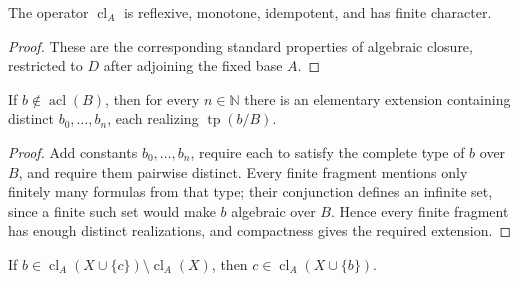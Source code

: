 \begin{lemma}
\label{lem:strongly-minimal-closure-laws}
\leanok
{}
The operator \(\operatorname{cl}_A\) is reflexive, monotone, idempotent,
and has finite character.
\end{lemma}

\begin{proof}
\leanok
These are the corresponding standard properties of algebraic closure,
restricted to \(D\) after adjoining the fixed base \(A\).
\end{proof}

\begin{lemma}
\label{lem:nonalgebraic-type-many-realizations}
\leanok
{}
If \(b\notin\operatorname{acl}(B)\), then for every
\(n\in\mathbb N\) there is an elementary extension containing distinct
\(b_0,\ldots,b_n\), each realizing \(\operatorname{tp}(b/B)\).
\end{lemma}

\begin{proof}
\leanok
Add constants \(b_0,\ldots,b_n\), require each to satisfy the complete
type of \(b\) over \(B\), and require them pairwise distinct.  Every
finite fragment mentions only finitely many formulas from that type;
their conjunction defines an infinite set, since a finite such set would
make \(b\) algebraic over \(B\).  Hence every finite fragment has enough
distinct realizations, and compactness gives the required extension.
\end{proof}

\begin{lemma}
\label{lem:strongly-minimal-exchange}
If \(b\in\operatorname{cl}_A(X\cup\{c\})\setminus\operatorname{cl}_A(X)\),
then \(c\in\operatorname{cl}_A(X\cup\{b\})\).
\end{lemma}

